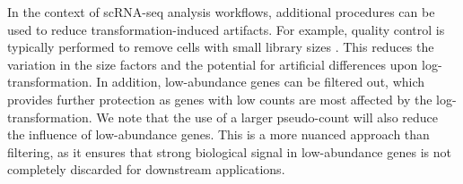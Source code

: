 \documentclass[10pt,letterpaper]{article}
\begin{document}
In the context of scRNA-seq analysis workflows, additional procedures can be used to reduce transformation-induced artifacts.
For example, quality control is typically performed to remove cells with small library sizes \cite{ilicic2016classification,lun2016stepbystep}.
This reduces the variation in the size factors and the potential for artificial differences upon log-transformation.
In addition, low-abundance genes can be filtered out, which provides further protection as genes with low counts are most affected by the log-transformation.
We note that the use of a larger pseudo-count will also reduce the influence of low-abundance genes.
This is a more nuanced approach than filtering, as it ensures that strong biological signal in low-abundance genes is not completely discarded for downstream applications.

% 
\end{document}
